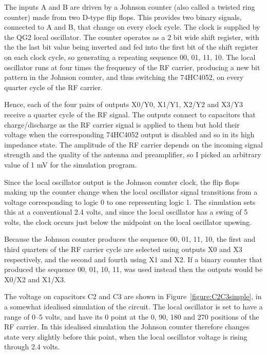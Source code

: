 \documentclass[11pt, twoside]{article}
\begin{document}
The inputs A and B are driven by a Johnson counter (also called a
twisted ring counter) made from two D-type flip flops.  This provides
two binary signals, connected to A and B, that change on every clock
cycle.  The clock is supplied by the QG2 local oscillator. The counter
operates as a 2 bit wide shift register, with the the last bit value
being inverted and fed into the first bit of the shift register on
each clock cycle, so generating a repeating sequence 00, 01, 11, 10.
The local oscillator runs at four times the frequency of the RF
carrier, producing a new bit pattern in the Johnson counter, and thus
switching the 74HC4052, on every quarter cycle of the RF carrier.

Hence, each of the four pairs of outputs X0/Y0, X1/Y1, X2/Y2 and X3/Y3
receive a quarter cycle of the RF signal.  The outputs connect to
capacitors that charge/discharge as the RF carrier signal is applied
to them but hold their voltage when the corresponding 74HC4052 output
is disabled and so in its high impedance state. The amplitude of the
RF carrier depends on the incoming signal strength and the quality of
the antenna and preamplifier, so I picked an arbitrary value of 1 mV
for the simulation program.

Since the local oscillator output is the Johnson counter clock, the
flip flops making up the counter change when the local oscillator
signal transitions from a voltage corresponding to logic 0 to one
representing logic 1.  The simulation sets this at a conventional 2.4
volts, and since the local oscillator has a swing of 5 volts, the
clock occurs just below the midpoint on the local oscillator upswing.

Because the Johnson counter produces the sequence 00, 01, 11, 10, the
first and third quarters of the RF carrier cycle are selected using
outputs X0 and X3 respectively, and the second and fourth using X1 and
X2.  If a binary counter that produced the sequence 00, 01, 10, 11,
was used instead then the outputs would be X0/X2 and X1/X3.

The voltage on capacitors C2 and C3 are shown in
Figure~\ref{figure:C2C3simple}, in a somewhat idealised simulation of
the circuit.  The local oscillator is set to have a range of 0--5
volts, and have its 0{\degree} point at the 0{\degree}, 90{\degree},
180{\degree} and 270{\degree} positions of the RF carrier.  In this
idealised simulation the Johnson counter therefore changes state very
slightly before this point, when the local oscillator voltage is
rising through 2.4 volts.
\end{document}

